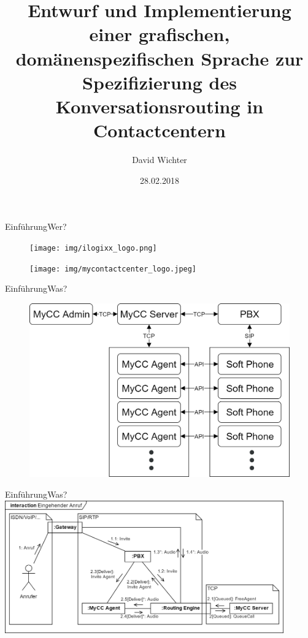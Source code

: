 \documentclass[t,aspectratio=169,divpsnames]{beamer}
\title[Entwurf und Implementierung einer DSL zur Spezifikation von Konversationsrouting]{Entwurf und Implementierung einer grafischen, domänenspezifischen Sprache zur Spezifizierung des Konversationsrouting in Contactcentern}
\author{David Wichter}
\institute{Hochschule Trier}
\date{28.02.2018}
\begin{document}
\begin{frame}
\titlepage
\end{frame}


\begin{frame}{Einführung}{Wer?}
	\only<1->
	{
		\begin{figure}
			\texttt{[image: img/ilogixx\_logo.png]}
		\end{figure}
	}
	{
		\begin{figure}
			\texttt{[image: img/mycontactcenter\_logo.jpeg]}
		\end{figure}
	}
\end{frame}

\begin{frame}{Einführung}{Was?}
	\begin{figure}
		\includegraphics[scale=0.2]{img/MyCCStructure.png}
	\end{figure}
\end{frame}

\begin{frame}{Einführung}{Was?}
	\center
	\includegraphics[width=0.9\textwidth]{img/RoutingEngineSipExplanation.png}
\end{frame}
\end{document}
